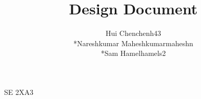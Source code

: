 \documentclass[11pt]{article}
\begin{document}
    \begin{titlepage}
    \title {Design Document}
    \maketitle
        \begin{center}
		SE 2XA3\\
		\author{
		Hui Chen\hspace{128pt}chenh43	
		\\*Nareshkumar Maheshkumar\hspace{35pt}maheshn 
		\\*Sam Hamel\hspace{118pt}hamels2 \\
		}
		\end{center}
    \end{titlepage}
    
    \newpage
\end{document}
